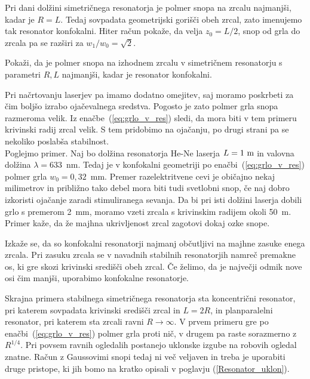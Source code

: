 \noindent
Pri dani dolžini simetričnega resonatorja je polmer snopa na zrcalu najmanjši,
kadar je $R=L$. Tedaj sovpadata geometrijski gorišči obeh zrcal,
zato imenujemo tak resonator konfokalni. 
Hiter račun pokaže, da velja $z_{0}=L/2$, snop od grla do zrcala pa se razširi
za $w_1/w_0=\sqrt{2}$. 
\begin{definition}
\label{naloga:uklon_konf}
 Pokaži, da je polmer snopa na izhodnem zrcalu v simetričnem resonatorju s parametri $R,L$
 najmanjši, kadar je resonator konfokalni.
\end{definition}

\noindent
Pri načrtovanju laserjev pa imamo dodatno omejitev, saj moramo poskrbeti za 
čim boljšo izrabo ojačevalnega sredstva. Pogosto je zato 
polmer grla snopa razmeroma velik. Iz enačbe~(\ref{eq:grlo_v_res})
sledi, da mora biti v tem primeru krivinski radij zrcal velik. S tem
pridobimo na ojačanju, po drugi strani pa se nekoliko poslabša stabilnost.\\

\noindent
Poglejmo primer. Naj bo dolžina resonatorja He-Ne laserja $L=1~\metre$ in valovna
dolžina $\lambda = 633$~nm. Tedaj je v konfokalni geometriji po enačbi~(\ref{eq:grlo_v_res})
polmer grla $w_{0}=0,32$~mm. Premer razelektritvene cevi je običajno
nekaj milimetrov in približno tako debel mora biti tudi svetlobni
snop, če naj dobro izkoristi ojačanje zaradi stimuliranega sevanja.
Da bi pri isti dolžini laserja dobili grlo s premerom 2~mm, moramo vzeti
zrcala s krivinskim radijem okoli 50~m. Primer kaže, da že majhna ukrivljenost 
zrcal zagotovi dokaj ozke snope.\\

\begin{remark}
Izkaže se, da so konfokalni resonatorji najmanj občutljivi na majhne zasuke enega zrcala. 
Pri zasuku zrcala se v navadnih stabilnih resonatorjih namreč premakne os, ki gre skozi 
krivinski središči obeh zrcal. Če želimo, da je največji odmik nove osi čim
manjši, uporabimo konfokalne resonatorje. 
\end{remark}

\noindent
Skrajna primera stabilnega simetričnega resonatorja sta 
koncentrični resonator,
pri katerem sovpadata krivinski središči zrcal in $L=2R$, in planparalelni 
resonator, pri katerem sta zrcali ravni $R \to \infty$.
V prvem primeru gre po enačbi~(\ref{eq:grlo_v_res}) polmer grla proti nič, v drugem pa raste sorazmerno
z $R^{1/4}$. Pri povsem ravnih ogledalih postanejo uklonske
izgube na robovih ogledal znatne. Račun z Gaussovimi snopi tedaj ni več veljaven
in treba je uporabiti druge pristope, ki jih bomo na kratko opisali
v poglavju (\ref{Resonator_uklon}).\\

